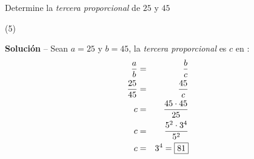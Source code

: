 \item{Determine la \textit{tercera proporcional} de $25$ y $45$
	\begin{tasks}(5)
	\end{tasks}
	\noindent \textbf{Solución} -- {\small Sean $a = 25$ y $b = 45$, la \textit{tercera proporcional} es $c$ en} :
	\begin{eqnarray*}
		\dfrac{a}{b} &=& \dfrac{b}{c} \\ 
		\dfrac{25}{45} &=& \dfrac{45}{c} \\ 
		c &=& \dfrac{45 \cdot 45}{25} \\
		c &=& \dfrac{5^2 \cdot 3^4}{5^2} \\
		c &=& 3^4  = \fbox{81} 
	\end{eqnarray*}
}
